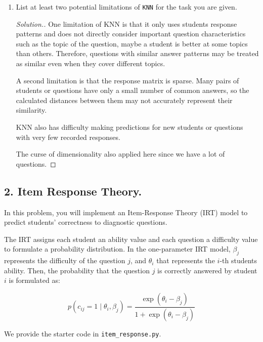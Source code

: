 \documentclass[11pt]{article}
\begin{document}
\begin{enumerate}
\item[(e)] List at least two potential limitations of \verb|KNN| for the task you are given.

\begin{proof}[Solution.]
    One limitation of KNN is that it only uses students response patterns and does not directly consider important question characteristics such as the topic of the question, maybe a student is better at some topics than others. Therefore, questions with similar answer patterns may be treated as similar even when they cover different topics. 

A second limitation is that the response matrix is sparse. Many pairs of students or questions have only a small number of common answers, so the calculated distances between them may not accurately represent their similarity. 

KNN also has difficulty making predictions for new students or questions with very few recorded responses. 

The curse of dimensionality also applied here since we have a lot of questions. 
\end{proof}

\end{enumerate}

\subsection*{2. Item Response Theory.} In this problem, you will implement an Item-Response Theory (IRT) model to predict students’ correctness to diagnostic questions.

The IRT assigns each student an ability value and each question a difficulty value to formulate a probability distribution. In the one-parameter IRT model, $\beta_j$ represents the difficulty of the question $j$, and $\theta_i$ that represents the $i$-th students ability. Then, the probability that the question $j$ is correctly answered by student $i$ is formulated as:

\[
p(c_{ij} = 1 \mid \theta_i, \beta_j) = \frac{\exp(\theta_i - \beta_j)}{1 + \exp(\theta_i - \beta_j)}
\]

We provide the starter code in \verb|item_response.py|.
\end{document}
